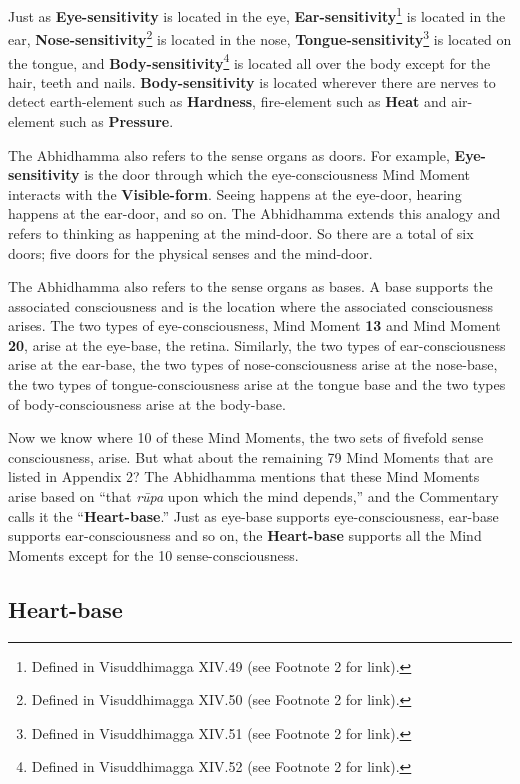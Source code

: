 Just as \textbf{Eye-sensitivity} is located in the eye, \textbf{Ear-sensitivity}\footnote{Defined in Visuddhimagga XIV.49 (see Footnote 2 for link).} is located in the ear, \textbf{Nose-sensitivity}\footnote{Defined in Visuddhimagga XIV.50 (see Footnote 2 for link).} is located in the nose, \textbf{Tongue-sensitivity}\footnote{Defined in Visuddhimagga XIV.51 (see Footnote 2 for link).} is located on the tongue, and \textbf{Body-sensitivity}\footnote{Defined in Visuddhimagga XIV.52 (see Footnote 2 for link).} is located all over the body except for the hair, teeth and nails. \textbf{Body-sensitivity} is located wherever there are nerves to detect earth-element such as \textbf{Hardness}, fire-element such as \textbf{Heat} and air-element such as \textbf{Pressure}.

\pagebreak

The Abhidhamma also refers to the sense organs as doors. For example, \textbf{Eye-sensitivity} is the door through which the eye-consciousness Mind Moment interacts with the \textbf{Visible-form}. Seeing happens at the eye-door, hearing happens at the ear-door, and so on. The Abhidhamma extends this analogy and refers to thinking as happening at the mind-door. So there are a total of six doors; five doors for the physical senses and the mind-door.

The Abhidhamma also refers to the sense organs as bases. A base supports the associated consciousness and is the location where the associated consciousness arises. The two types of eye-consciousness, Mind Moment \textbf{13} and Mind Moment \textbf{20}, arise at the eye-base, the retina. Similarly, the two types of ear-consciousness arise at the ear-base, the two types of nose-consciousness arise at the nose-base, the two types of tongue-consciousness arise at the tongue base and the two types of body-consciousness arise at the body-base.

Now we know where 10 of these Mind Moments, the two sets of fivefold sense consciousness, arise. But what about the remaining 79 Mind Moments that are listed in Appendix 2? The Abhidhamma mentions that these Mind Moments arise based on “that \textit{rūpa} upon which the mind depends,” and the Commentary calls it the “\textbf{Heart-base}.” Just as eye-base supports eye-consciousness, ear-base supports ear-consciousness and so on, the \textbf{Heart-base} supports all the Mind Moments except for the 10 sense-consciousness.

\subsection*{Heart-base}

